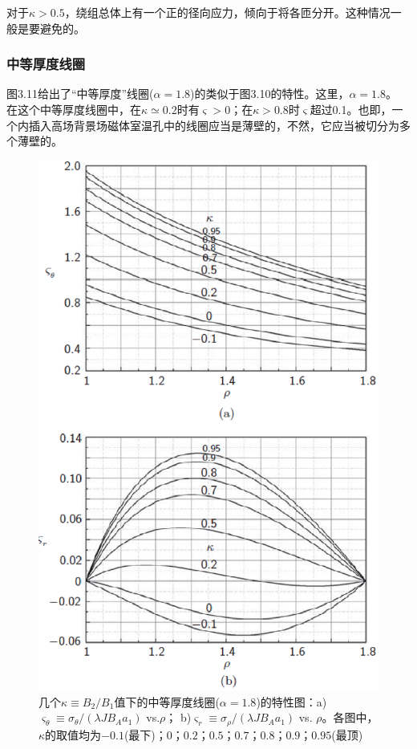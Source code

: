 对于$\kappa>0.5$，绕组总体上有一个正的径向应力，倾向于将各匝分开。这种情况一般是要避免的。

\subsubsection{中等厚度线圈}
图3.11给出了“中等厚度”线圈($\alpha=1.8$)的类似于图3.10的特性。这里，$\alpha=1.8$。
在这个中等厚度线圈中，在$\kappa\simeq 0.2$时有$\varsigma>0$；在$\kappa> 0.8$时$\varsigma$超过0.1。也即，一个内插入高场背景场磁体室温孔中的线圈应当是薄壁的，不然，它应当被切分为多个薄壁的。

\begin{figure}
  \centering
 \includegraphics[scale=0.7]{chpt3/figs/fig3.11.eps}
  \caption{几个$\kappa\equiv B_2/B_1$值下的中等厚度线圈($\alpha=1.8$)的特性图：a)$\varsigma_\theta\equiv \sigma_\theta/(\lambda J B_A a_1)$ vs.$\rho$；
  b)$\varsigma_r \equiv \sigma_\rho/(\lambda J B_A a_1)$ vs. $\rho$。各图中，$\kappa$的取值均为$-0.1$(最下)；$0$；$0.2$；$0.5$；$0.7$；$0.8$；$0.9$；$0.95$(最顶) }
\end{figure}


